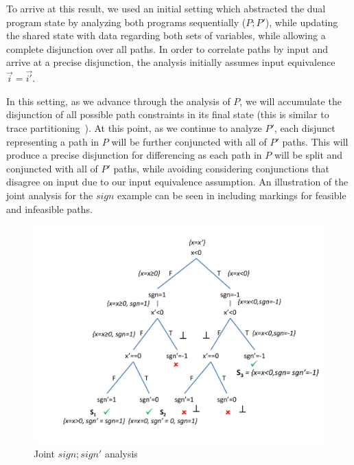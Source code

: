 To arrive at this result, we used an initial setting which abstracted the dual program state by analyzing both programs sequentially ($P;P'$), while updating the shared state with data regarding both sets of variables, while allowing a complete disjunction over all paths. In order to correlate paths by input and arrive at a precise disjunction, the analysis initially assumes input equivalence $\vec{i} = \vec{i'}$.

In this setting, as we advance through the analysis of $P$, we will accumulate the disjunction of all possible path constraints in its final state (this is similar to trace partitioning~\cite{MauborgneRival07}). At this point, as we continue to analyze $P'$, each disjunct representing a path in $P$ will be further conjuncted with all of $P'$ paths. This will produce a precise disjunction for differencing as each path in $P$ will be split and conjuncted with all of $P'$ paths, while avoiding considering conjunctions that disagree on input due to our input equivalence assumption. An illustration of the joint analysis for the $sign$ example can be seen in  including markings for feasible and infeasible paths.



\begin{figure}
\centering
\includegraphics[scale=0.38,clip=true,trim = 75pt 25pt 5pt 20pt]{figures/sign-graph-joint}
\caption{Joint $sign;sign'$ analysis}
\end{figure}

